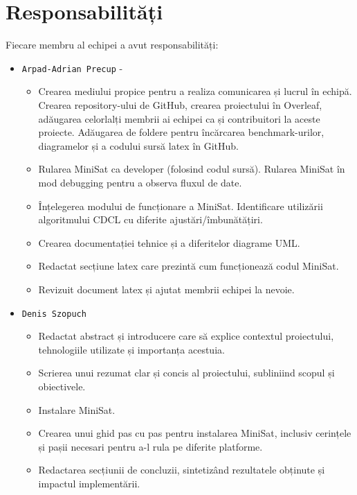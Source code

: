 \documentclass{llncs}
\begin{document}
\section{Responsabilități}
Fiecare membru al echipei a avut responsabilități:
\begin{itemize}
    \item \texttt{Arpad-Adrian Precup} - 
    \begin{itemize}
        \item Crearea mediului propice pentru a realiza comunicarea și lucrul în echipă. Crearea repository-ului de GitHub, crearea proiectului în Overleaf, adăugarea celorlalți membrii ai echipei ca și contribuitori la aceste proiecte. Adăugarea de foldere pentru încărcarea benchmark-urilor, diagramelor și a codului sursă latex în GitHub.
        \item Rularea MiniSat ca developer (folosind codul sursă). Rularea MiniSat în mod debugging pentru a observa fluxul de date.
        \item Înțelegerea modului de funcționare a MiniSat. Identificare utilizării algoritmului CDCL cu diferite ajustări/îmbunătățiri.
        \item Crearea documentației tehnice și a diferitelor diagrame UML.
        \item Redactat secțiune latex care prezintă cum funcționează codul MiniSat.
        \item Revizuit document latex și ajutat membrii echipei la nevoie.
\\
    \end{itemize}

    \item \texttt{Denis Szopuch}
    \begin{itemize}
        \item Redactat abstract și introducere care să explice contextul proiectului, tehnologiile utilizate și importanța acestuia.
        \item Scrierea unui rezumat clar și concis al proiectului, subliniind scopul și obiectivele.
        \item Instalare MiniSat.
        \item Crearea unui ghid pas cu pas pentru instalarea MiniSat, inclusiv cerințele și pașii necesari pentru a-l rula pe diferite platforme.
        \item Redactarea secțiunii de concluzii, sintetizând rezultatele obținute și impactul implementării.
        \\
    \end{itemize}


\end{itemize}
\end{document}
